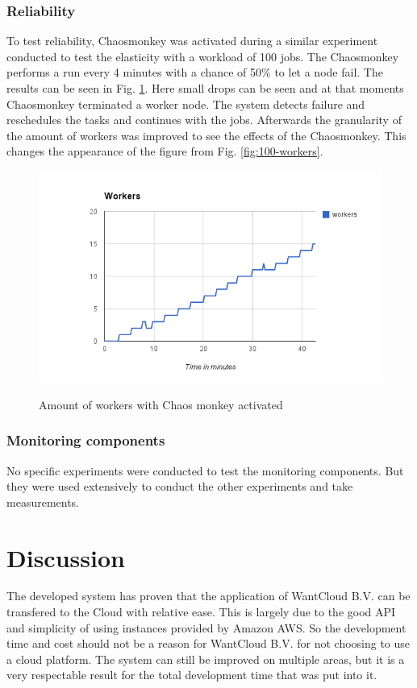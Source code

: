 \documentclass[a4paper]{IEEEtran}
\begin{document}
\subsubsection{Reliability}
To test reliability, Chaosmonkey was activated during a similar experiment conducted to test the elasticity with a workload of 100 jobs.
The Chaosmonkey performs a run every 4 minutes with a chance of 50\% to let a node fail.
The results can be seen in Fig. \ref{fig:chaos-workers}.
Here small drops can be seen and at that moments Chaosmonkey terminated a worker node.
The system detects failure and reschedules the tasks and continues with the jobs.
Afterwards the granularity of the amount of workers was improved to see the effects of the Chaosmonkey.
This changes the appearance of the figure from Fig. \ref{fig:100-workers}.

\begin{figure}[ht]
	\includegraphics[scale=0.45]{fig/chaos-workers.png}
	\label{fig:chaos-workers}
	\caption{Amount of workers with Chaos monkey activated}
\end{figure}

\subsubsection{Monitoring components}
No specific experiments were conducted to test the monitoring components.
But they were used extensively to conduct the other experiments and take measurements.

\section{Discussion}
The developed system has proven that the application of WantCloud B.V. can be transfered to the Cloud with relative ease.
This is largely due to the good API and simplicity of using instances provided by Amazon AWS.
So the development time and cost should not be a reason for WantCloud B.V. for not choosing to use a cloud platform.
The system can still be improved on multiple areas,
but it is a very respectable result for the total development time that was put into it.
\end{document}
